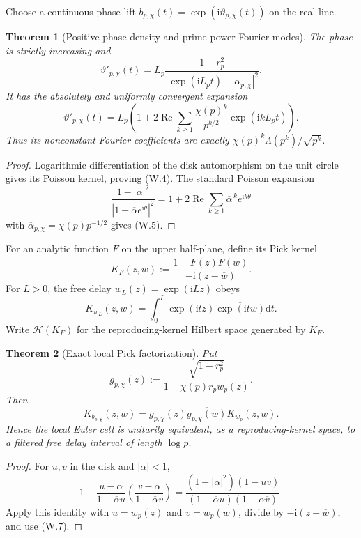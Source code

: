 \documentclass[11pt]{article}
\newtheorem{theorem}{Theorem}[section]
\theoremstyle{definition}
\theoremstyle{remark}
\newcommand{\dd}{\mathrm d}
\begin{document}
Choose a continuous phase lift
$b_{p,\chi}(t)=\exp(\mathrm i\vartheta_{p,\chi}(t))$ on the real line.

\begin{theorem}[Positive phase density and prime-power Fourier modes]
\label{thm:weil-phase-density}
The phase is strictly increasing and
\[
 \boxed{
 \vartheta'_{p,\chi}(t)
 =L_p\frac{1-r_p^2}
 {|\exp(\mathrm iL_pt)-\alpha_{p,\chi}|^2}.}
 \tag{W.4}
\]
It has the absolutely and uniformly convergent expansion
\[
 \boxed{
 \vartheta'_{p,\chi}(t)
 =L_p\left(
 1+2\operatorname{Re}\sum_{k\ge1}
 \frac{\chi(p)^k}{p^{k/2}}
 \exp(\mathrm ikL_pt)
 \right).}
 \tag{W.5}
\]
Thus its nonconstant Fourier coefficients are exactly
$\chi(p)^k\Lambda(p^k)/\sqrt{p^k}$.
\end{theorem}

\begin{proof}
Logarithmic differentiation of the disk automorphism on the unit circle gives
its Poisson kernel, proving \textup{(W.4)}.  The standard Poisson expansion
\[
 \frac{1-|\alpha|^2}{|1-\overline\alpha e^{\mathrm i\theta}|^2}
 =1+2\operatorname{Re}\sum_{k\ge1}
   \overline\alpha^{\,k}e^{\mathrm ik\theta}
\]
with $\overline\alpha_{p,\chi}=\chi(p)p^{-1/2}$ gives \textup{(W.5)}.
\end{proof}

For an analytic function $F$ on the upper half-plane, define its Pick kernel
\[
 K_F(z,w)
 :=\frac{1-F(z)\overline{F(w)}}{-\mathrm i(z-\overline w)}.
 \tag{W.6}
\]
For $L>0$, the free delay $w_L(z)=\exp(\mathrm iLz)$ obeys
\[
 K_{w_L}(z,w)
 =\int_0^L\exp(\mathrm itz)
   \overline{\exp(\mathrm itw)}\dd t.
 \tag{W.7}
\]
Write $\mathcal H(K_F)$ for the reproducing-kernel Hilbert space generated by
$K_F$.

\begin{theorem}[Exact local Pick factorization]
\label{thm:weil-Pick-factorization}
Put
\[
 g_{p,\chi}(z)
 :=\frac{\sqrt{1-r_p^2}}
 {1-\chi(p)r_pw_p(z)}.
\]
Then
\[
 \boxed{
 K_{b_{p,\chi}}(z,w)
 =g_{p,\chi}(z)\overline{g_{p,\chi}(w)}K_{w_p}(z,w).}
 \tag{W.8}
\]
Hence the local Euler cell is unitarily equivalent, as a reproducing-kernel
space, to a filtered free delay interval of length $\log p$.
\end{theorem}

\begin{proof}
For $u,v$ in the disk and $|\alpha|<1$,
\[
 1-\frac{u-\alpha}{1-\overline\alpha u}
 \overline{\left(\frac{v-\alpha}{1-\overline\alpha v}\right)}
 =\frac{(1-|\alpha|^2)(1-u\overline v)}
 {(1-\overline\alpha u)(1-\alpha\overline v)}.
\]
Apply this identity with $u=w_p(z)$ and $v=w_p(w)$, divide by
$-\mathrm i(z-\overline w)$, and use \textup{(W.7)}.
\end{proof}
\end{document}
